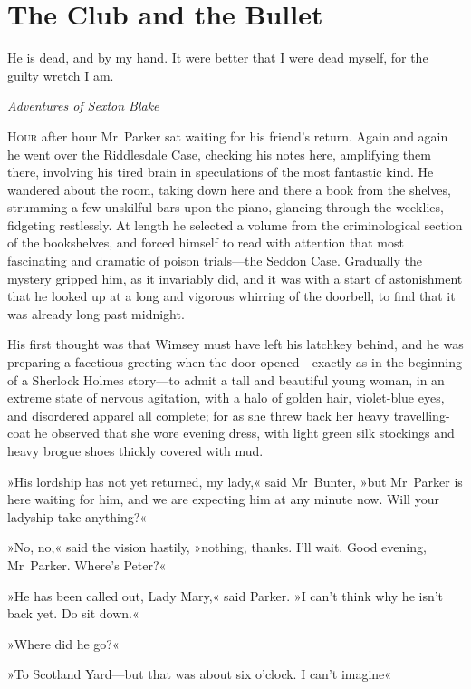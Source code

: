 


\chapter{The Club and the Bullet}

\epigraph{He is dead, and by my hand. It were better that I were dead myself, for the guilty wretch I am.}{\textit{Adventures of Sexton Blake}}


\lettrine[lines=4]{H}{our} after hour Mr~Parker sat waiting for his friend's return. Again and again he went over the Riddlesdale Case, checking his notes here, amplifying them there, involving his tired brain in speculations of the most fantastic kind. He wandered about the room, taking down here and there a book from the shelves, strumming a few unskilful bars upon the piano, glancing through the weeklies, fidgeting restlessly.  At length he selected a volume from the criminological section of the bookshelves, and forced himself to read with attention that most fascinating and dramatic of poison trials—the Seddon Case. Gradually the mystery gripped him, as it invariably did, and it was with a start of astonishment that he looked up at a long and vigorous whirring of the doorbell, to find that it was already long past midnight.

His first thought was that Wimsey must have left his latchkey behind, and he was preparing a facetious greeting when the door opened—exactly as in the beginning of a Sherlock Holmes story—to admit a tall and beautiful young woman, in an extreme state of nervous agitation, with a halo of golden hair, violet-blue eyes, and disordered apparel all complete; for as she threw back her heavy travelling-coat he observed that she wore evening dress, with light green silk stockings and heavy brogue shoes thickly covered with mud.

»His lordship has not yet returned, my lady,« said Mr~Bunter, »but Mr~Parker is here waiting for him, and we are expecting him at any minute now. Will your ladyship take anything?«

»No, no,« said the vision hastily, »nothing, thanks. I'll wait. Good evening, Mr~Parker. Where's Peter?«

»He has been called out, Lady Mary,« said Parker. »I can't think why he isn't back yet. Do sit down.«

»Where did he go?«

»To Scotland Yard—but that was about six o'clock. I can't imagine\longdash«

